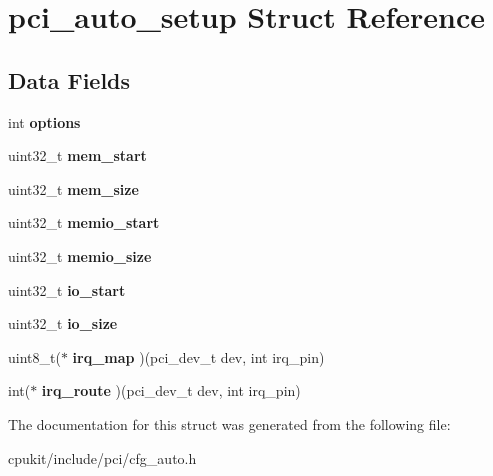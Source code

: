 \hypertarget{structpci__auto__setup}{}\section{pci\+\_\+auto\+\_\+setup Struct Reference}
\label{structpci__auto__setup}
\subsection*{Data Fields}
\begin{DoxyCompactItemize}
\item 
\mbox{\label{structpci__auto__setup_ad7271f58f45235dfb3e8c91e794dca38}} 
int {\bfseries options}
\item 
\mbox{\label{structpci__auto__setup_ac69552e3afa63285be41dce04f6f0dab}} 
uint32\+\_\+t {\bfseries mem\+\_\+start}
\item 
\mbox{\label{structpci__auto__setup_afaa861a9f4ac3634580881350b6e24d9}} 
uint32\+\_\+t {\bfseries mem\+\_\+size}
\item 
\mbox{\label{structpci__auto__setup_a3f59eef9111a63c549fa31a13ca8775b}} 
uint32\+\_\+t {\bfseries memio\+\_\+start}
\item 
\mbox{\label{structpci__auto__setup_ab18f56a14c902ced1b661b5774349902}} 
uint32\+\_\+t {\bfseries memio\+\_\+size}
\item 
\mbox{\label{structpci__auto__setup_a4155b7c07bdf668f3bc0a57b092efc86}} 
uint32\+\_\+t {\bfseries io\+\_\+start}
\item 
\mbox{\label{structpci__auto__setup_ac2e22c6d2f47204bab57ad69ee7e79a2}} 
uint32\+\_\+t {\bfseries io\+\_\+size}
\item 
\mbox{\label{structpci__auto__setup_acc5250bb1d687c6159e14dac8b00e2ba}} 
uint8\+\_\+t($\ast$ {\bfseries irq\+\_\+map} )(pci\+\_\+dev\+\_\+t dev, int irq\+\_\+pin)
\item 
\mbox{\label{structpci__auto__setup_a5fb6f6607403b77c6618c2e7797bb96f}} 
int($\ast$ {\bfseries irq\+\_\+route} )(pci\+\_\+dev\+\_\+t dev, int irq\+\_\+pin)
\end{DoxyCompactItemize}


The documentation for this struct was generated from the following file\+:\begin{DoxyCompactItemize}
\item 
cpukit/include/pci/cfg\+\_\+auto.\+h\end{DoxyCompactItemize}

